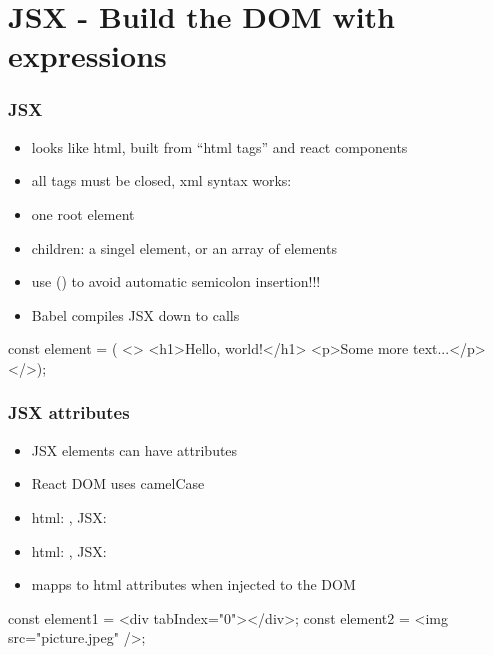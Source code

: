 \section{JSX - Build the DOM with expressions}
\begin{frame}[fragile] \frametitle{JSX}
\begin{itemize}
  \item looks like html, built from ``html tags'' and react components
  \item all tags must be closed, xml syntax works: 
  \item one root element
  \item children: a singel element, or an array of elements
  \item use () to avoid automatic semicolon insertion!!!
  \item Babel compiles JSX down to  calls
\end{itemize}

\begin{CodeBox}{}
const element = (
<>
  <h1>Hello, world!</h1>
  <p>Some more text...</p>
</>);
\end{CodeBox}
\end{frame}

\begin{frame}[fragile] \frametitle{JSX attributes}
\begin{itemize}
  \item JSX elements can have attributes
  \item React DOM uses camelCase
  \item html: , JSX: 
  \item html: , JSX: 
  \item mapps to html attributes when injected to the DOM
\end{itemize}

\vspace{8mm}
\begin{CodeBox}{}
const element1 = <div tabIndex="0"></div>;
const element2 = <img src="picture.jpeg" />;
\end{CodeBox}
\end{frame}

